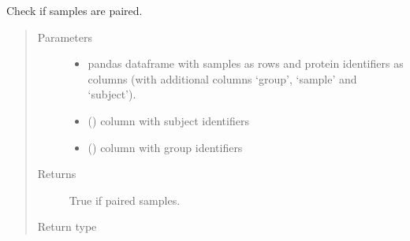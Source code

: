 \documentclass[letterpaper,10pt,english]{sphinxmanual}
\begin{document}
\begin{fulllineitems}
\label{\detokenize{_autosummary/analytics_core.analytics:analytics_core.analytics.analytics.check_is_paired}}
Check if samples are paired.
\begin{quote}\begin{description}
\item[{Parameters}] \leavevmode\begin{itemize}
\item {} 
 \textendash{} pandas dataframe with samples as rows and protein identifiers as columns (with additional columns ‘group’, ‘sample’ and ‘subject’).

\item {} 
 () \textendash{} column with subject identifiers

\item {} 
 () \textendash{} column with group identifiers

\end{itemize}

\item[{Returns}] \leavevmode
True if paired samples.

\item[{Return type}] \leavevmode
{}

\end{description}\end{quote}

\end{fulllineitems}

\end{document}
